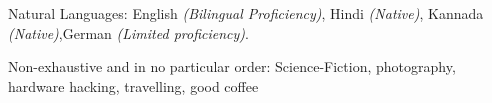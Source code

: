 \documentclass[10pt,a4paper]{article}
\begin{document}
\inlineheadsection
  {Natural Languages:}
  {English \emph{(Bilingual Proficiency)}, Hindi \emph{(Native)}, Kannada \emph{(Native)},German \emph{(Limited proficiency)}.}


\spacedhrule{1.6em}{-0.4em}


\inlineheadsection
  {Non-exhaustive and in no particular order:}
  {Science-Fiction, photography, hardware hacking, travelling, good coffee}
\end{document}

